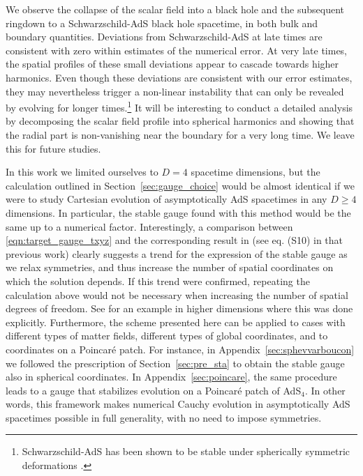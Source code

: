 \documentclass[a4paper,11pt]{article}
\numberwithin{equation}{section}
\begin{document}
We observe the collapse of the scalar field into a black hole and the subsequent ringdown to a Schwarzschild-AdS  black hole spacetime, in both bulk and boundary quantities.
Deviations from Schwarzschild-AdS at late times are consistent with zero within estimates of the numerical error. 
At very late times, the spatial profiles of these small deviations appear to cascade towards higher harmonics.
Even though these deviations are consistent with our error estimates, they may nevertheless trigger a non-linear instability that can only be revealed by evolving for longer times.\footnote{Schwarzschild-AdS has been shown to be stable under spherically symmetric deformations \cite{Holzegel:2011uu}.} 
It will be interesting to conduct a detailed analysis by decomposing the scalar field profile into spherical harmonics and showing that the radial part is non-vanishing near the boundary for a very long time.
We leave this for future studies.

In this work we limited ourselves to $D=4$ spacetime dimensions, but the calculation outlined in Section~\ref{sec:gauge_choice} would be almost identical if we were to study Cartesian evolution of asymptotically AdS spacetimes in any $D\geq4$ dimensions. In particular, the stable gauge found with this method would be the same up to a numerical factor. 
Interestingly, a comparison between \eqref{eqn:target_gauge_txyz} and the corresponding result in \cite{Bantilan:2017kok} (see eq. (S10) in that previous work) clearly suggests a trend for the expression of the stable gauge as we relax symmetries, and thus increase the number of spatial coordinates on which the solution depends.
If this trend were confirmed, repeating the calculation above would not be necessary when increasing the number of spatial degrees of freedom.
See \cite{Bantilan:2020pay} for an example in higher dimensions where this was done explicitly.
Furthermore, the scheme presented here can be applied to cases with different types of matter fields, different types of global coordinates, and to coordinates on a Poincar\'{e} patch.
For instance, in Appendix~\ref{sec:sphevvarboucon} we followed the prescription of Section~\ref{sec:pre_sta} to obtain the stable gauge also in spherical coordinates.
In Appendix~\ref{sec:poincare}, the same procedure leads to a gauge that stabilizes evolution on a Poincar\'e patch of AdS$_4$.
In other words, this framework makes numerical Cauchy evolution in asymptotically AdS spacetimes possible in full generality, with no need to impose symmetries.
\end{document}
